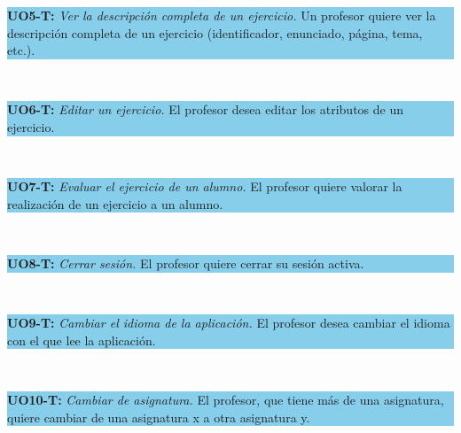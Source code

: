 \vspace{0.1cm}

\colorbox{SkyBlue}{\parbox[c]{1.0\textwidth}{
\textbf{UO5-T:} \textit{Ver la descripción completa de un ejercicio.} Un profesor quiere ver la descripción completa de un ejercicio (identificador, enunciado, página, tema, etc.).\\
}}\\

\vspace{0.1cm}

\colorbox{SkyBlue}{\parbox[c]{1.0\textwidth}{
\textbf{UO6-T:} \textit{Editar un ejercicio.} El profesor desea editar los atributos de un ejercicio.\\
}}\\

\vspace{0.1cm}

\colorbox{SkyBlue}{\parbox[c]{1.0\textwidth}{
\textbf{UO7-T:} \textit{Evaluar el ejercicio de un alumno.} El profesor quiere valorar la realización de un ejercicio a un alumno.\\
}}\\

\vspace{0.1cm}

\colorbox{SkyBlue}{\parbox[c]{1.0\textwidth}{
\textbf{UO8-T:} \textit{Cerrar sesión.} El profesor quiere cerrar su sesión activa.\\
}}\\

\vspace{0.1cm}

\colorbox{SkyBlue}{\parbox[c]{1.0\textwidth}{
\textbf{UO9-T:} \textit{Cambiar el idioma de la aplicación.} El profesor desea cambiar el idioma con el que lee la aplicación.\\
}}\\

\vspace{0.1cm}

\colorbox{SkyBlue}{\parbox[c]{1.0\textwidth}{
\textbf{UO10-T:} \textit{Cambiar de asignatura.} El profesor, que tiene más de una asignatura, quiere cambiar de una asignatura x a otra asignatura y.\\
}}\\



